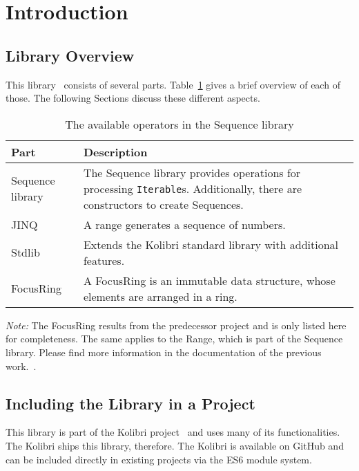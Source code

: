 \section{Introduction} %
\label{sec:Introduction}

\subsection{Library Overview} %
\label{sub:Sequence Library Overview}
This library~\cite{wildwyss_kolibri} consists of several parts. Table~\ref{tab:library_overview} gives a brief
overview of each of those. The following Sections discuss these different
aspects.

\begin{table}[H]
  \centering
  \begin{tabularx}{\textwidth}{| l | X |} \hline
    \textbf{Part} & \textbf{Description} \\ \hline
    Sequence library & The Sequence library provides operations for processing \lstinline{Iterable}s. Additionally, there are constructors to create Sequences.\\ \hline 
    JINQ & A range generates a sequence of numbers. \\ \hline 
    Stdlib & Extends the Kolibri standard library with additional features.\\ \hline 
    FocusRing & A FocusRing is an immutable data structure, whose elements are arranged in a ring. \\ \hline 
  \end{tabularx}
  \caption{The available operators in the Sequence library}
  \label{tab:library_overview}
\end{table}

\textit{Note:} The FocusRing results from the predecessor project and is only
listed here for completeness. The same applies to the Range, which is part of
the Sequence library. Please find more information in the documentation of
the previous work.~\cite{wild_ip5_2023}. 

\subsection{Including the Library in a Project} %
\label{sub:Including the Library in a Project}
This library is part of the Kolibri project~\cite{kolibri} and uses many of its
functionalities. The Kolibri ships this library, therefore. The Kolibri
is available on GitHub and can be included directly in existing projects via
the ES6 module system.
